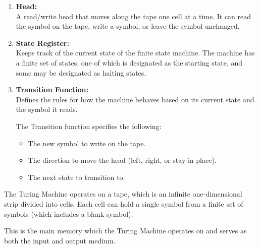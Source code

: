 \begin{enumerate}
    \item \textbf{Head:} \\
    A read/write head that moves along the tape one cell at a time.
    It can read the symbol on the tape, write a symbol, or leave the symbol unchanged.

    \item \textbf{State Register:} \\
    Keeps track of the current state of the finite state machine.
    The machine has a finite set of states, one of which is designated as the starting state, and some may be designated as halting states.

    \item \textbf{Transition Function:} \\
    Defines the rules for how the machine behaves based on its current state and the symbol it reads.

    The Transition function specifies the following:
    \begin{itemize}
        \item The new symbol to write on the tape.
        \item The direction to move the head (left, right, or stay in place).
        \item The next state to transition to.
    \end{itemize}
\end{enumerate}

The Turing Machine operates on a tape, which is an infinite one-dimensional strip divided into cells. 
Each cell can hold a single symbol from a finite set of symbols (which includes a blank symbol).

This is the main memory which the Turing Machine operates on and serves as both the input and output medium.


